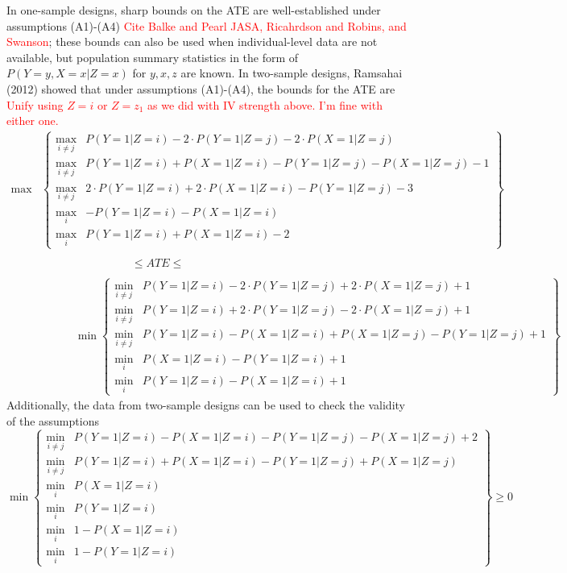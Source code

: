 \documentclass[
]{article}
\theoremstyle{plain}
\begin{document}
In one-sample designs, sharp bounds on the ATE are well-established under assumptions (A1)-(A4) \textcolor{red}{Cite Balke and Pearl JASA, Ricahrdson and Robins, and Swanson}; these bounds can also be used when individual-level data are not available, but population summary statistics in the form of $P(Y=y,X=x | Z=x)$ for $y,x,z$ are known. In two-sample designs, Ramsahai (2012) showed that under assumptions (A1)-(A4), the bounds for the ATE are
\textcolor{red}{Unify using $Z = i$ or $Z = z_1$ as we did with IV strength above. I'm fine with either one.}
\[
\begin{aligned}
\max &\left \{
\begin{array}{ll}
  \max_{i\neq j} & P(Y = 1 | Z = i) - 2\cdot P(Y = 1 | Z = j) - 2\cdot P(X = 1 | Z = j) \\
  \max_{i\neq j} & P(Y = 1 | Z = i) + P(X = 1 | Z = i) - P(Y = 1 | Z = j) - P(X = 1 | Z = j) - 1 \\
  \max_{i\neq j} & 2\cdot P(Y = 1 | Z = i) + 2\cdot P(X = 1 | Z = i) - P(Y = 1 | Z = j) - 3 \\
  \max_i & -P(Y = 1 | Z = i) - P(X = 1 | Z = i) \\
  \max_i & P(Y = 1 | Z = i) +  P(X = 1 | Z = i) - 2
\end{array}
\right \} \\ \\
& \qquad \qquad \qquad \qquad \le ATE \le \\ \\
& \qquad \quad \min \left \{
\begin{array}{ll}
  \min_{i \neq j} & P(Y = 1 | Z = i) - 2\cdot P(Y = 1 | Z = j) +  2\cdot P(X = 1 | Z = j) + 1 \\
  \min_{i \neq j} & P(Y = 1 | Z = i) + 2\cdot P(Y = 1 | Z = j) -  2\cdot P(X = 1 | Z = j) + 1 \\
  \min_{i \neq j} & P(Y = 1 | Z = i) - P(X = 1 | Z = i) + P(X = 1 | Z = j) - P(Y = 1 | Z = j) + 1 \\
  \min_i & P(X = 1 | Z = i) - P(Y = 1 | Z = i) + 1 \\
  \min_i & P(Y = 1 | Z = i) - P(X = 1 | Z = i) + 1 
\end{array} 
\right \} \label{eq:ate_bound}
\end{aligned}
\]
Additionally, the data from two-sample designs can be used to check the validity of the assumptions
\begin{equation}
\min \left\{
  \begin{array}{ll}
    \min_{i\neq j} & P(Y = 1 | Z = i) - P(X = 1 | Z = i) - P(Y = 1 | Z = j) - P(X = 1 | Z = j) + 2 \\
    \min_{i\neq j} & P(Y = 1 | Z = i) + P(X = 1 | Z = i) - P(Y = 1 | Z = j) + P(X = 1 | Z = j) \\
    \min_{i} & P(X = 1 | Z = i) \\
    \min_{i} & P(Y = 1 | Z = i) \\
    \min_{i} & 1 - P(X = 1 | Z = i) \\
    \min_{i} & 1 - P(Y = 1 | Z = i) 
  \end{array} 
\right \} \ge 0 \label{eq:constraints}
\end{equation}
\end{document}
